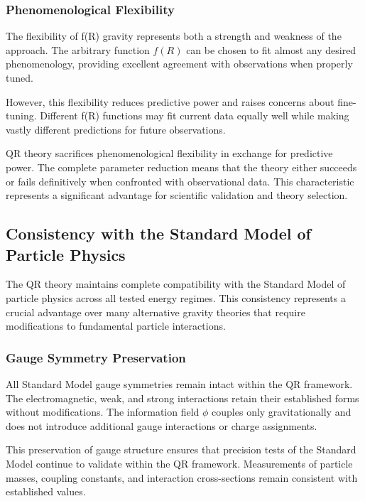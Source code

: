 \subsubsection{Phenomenological Flexibility}
\label{subsubsec:phenomenological-fr}

The flexibility of f(R) gravity represents both a strength and weakness of the approach. The arbitrary function $f(R)$ can be chosen to fit almost any desired phenomenology, providing excellent agreement with observations when properly tuned.

However, this flexibility reduces predictive power and raises concerns about fine-tuning. Different f(R) functions may fit current data equally well while making vastly different predictions for future observations.

QR theory sacrifices phenomenological flexibility in exchange for predictive power. The complete parameter reduction means that the theory either succeeds or fails definitively when confronted with observational data. This characteristic represents a significant advantage for scientific validation and theory selection.

\subsection{Consistency with the Standard Model of Particle Physics}
\label{subsec:standard-model-consistency}

The QR theory maintains complete compatibility with the Standard Model of particle physics across all tested energy regimes. This consistency represents a crucial advantage over many alternative gravity theories that require modifications to fundamental particle interactions.

\subsubsection{Gauge Symmetry Preservation}
\label{subsubsec:gauge-symmetry}

All Standard Model gauge symmetries remain intact within the QR framework. The electromagnetic, weak, and strong interactions retain their established forms without modifications. The information field $\phi$ couples only gravitationally and does not introduce additional gauge interactions or charge assignments.

This preservation of gauge structure ensures that precision tests of the Standard Model continue to validate within the QR framework. Measurements of particle masses, coupling constants, and interaction cross-sections remain consistent with established values.

